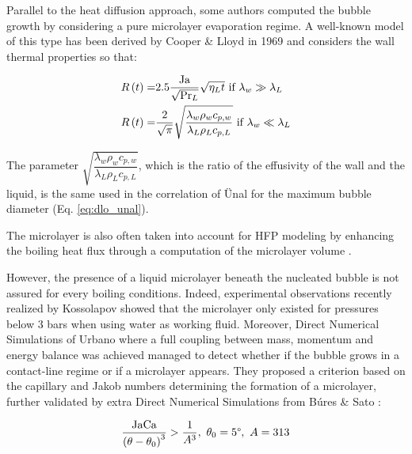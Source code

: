 Parallel to the heat diffusion approach, some authors computed the bubble growth by considering a pure microlayer evaporation regime. A well-known model of this type has been derived by Cooper \& Lloyd in 1969 \cite{cooper_microlayer_1969} and considers the wall thermal properties so that:

\begin{align} 
R\parth{t} =& 2.5 \dfrac{\Ja}{\sqrt{\Pr_{L}}}\sqrt{\eta_{L}t}\ \text{if}\ \lambda_{w} \gg \lambda_{L} \\
%
R\parth{t} =& \dfrac{2}{\sqrt{\pi}} \sqrt{\dfrac{\lambda_{w}\rho_{w}c_{p,w}}{\lambda_{L}\rho_{L}c_{p,L}}}\ \text{if}\ \lambda_{w} \ll \lambda_{L}
\end{align}

\begin{remark*}{}
The parameter $ \sqrt{\dfrac{\lambda_{w}\rho_{w}c_{p,w}}{\lambda_{L}\rho_{L}c_{p,L}}}$, which is the ratio of the effusivity of the wall and the liquid, is the same used in the correlation of \"Unal for the maximum bubble diameter (Eq. \ref{eq:dlo_unal}).
\end{remark*}

The microlayer is also often taken into account for HFP modeling by enhancing the boiling heat flux through a computation of the microlayer volume \cite{kommajosyula_development_2020, demarly_new_2020}. 

\npar

However, the presence of a liquid microlayer beneath the nucleated bubble is not assured for every boiling conditions. Indeed, experimental observations recently realized by Kossolapov \cite{kossolapov_experimental_2021} showed that the microlayer only existed for pressures below 3 bars when using water as working fluid. Moreover, Direct Numerical Simulations of Urbano \etal \cite{urbano_direct_2018} where a full coupling between mass, momentum and energy balance was achieved managed to detect whether if the bubble grows in a contact-line regime or if a microlayer appears. They proposed a criterion based on the capillary and Jakob numbers determining the formation of a microlayer, further validated by extra Direct Numerical Simulations from B\'ures \& Sato \cite{bures_modelling_2021}:

\begin{equation}
\frac{\mathrm{Ja} \mathrm{Ca}}{\left( \theta-\theta_{0} \right)^{3}} > \frac{1}{A^{3}},\ \theta_{0}=5\degree,\ A=313
\end{equation}

